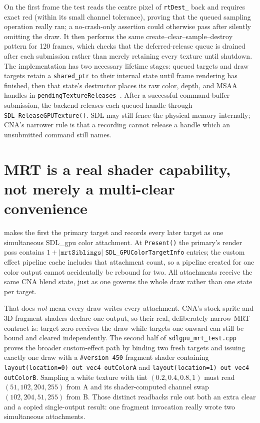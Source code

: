 On the first frame the test reads the centre pixel of \texttt{rtDest\_} back and requires exact
red (within its small channel tolerance), proving that the queued sampling operation really
ran; a no-crash-only assertion could otherwise pass after silently omitting the draw. It then
performs the same create--clear--sample--destroy pattern for 120 frames, which checks that the
deferred-release queue is drained after each submission rather than merely retaining every
texture until shutdown. The implementation has two necessary lifetime stages: queued targets
and draw targets retain a \texttt{shared\_ptr} to their internal state until frame rendering has
finished, then that state's destructor places its raw color, depth, and MSAA handles in
\texttt{pendingTextureReleases\_}. After a successful command-buffer submission, the backend
releases each queued handle through \texttt{SDL\_ReleaseGPUTexture()}. SDL may still fence the
physical memory internally; CNA's narrower rule is that a recording cannot release a handle
which an unsubmitted command still names.

\section{MRT is a real shader capability, not merely a multi-clear convenience}

 makes the first
 the primary target and records every later target as one simultaneous
SDL\_gpu color attachment. At \texttt{Present()} the primary's render pass contains
\(1+\lvert\texttt{mrtSiblings}\rvert\) \texttt{SDL\_GPUColorTargetInfo} entries; the custom
effect pipeline cache includes that attachment count, so a pipeline created for one color output
cannot accidentally be rebound for two. All attachments receive the same CNA blend state, just
as one  governs the whole draw rather than one state per
target.

That does \emph{not} mean every draw writes every attachment. CNA's stock sprite and 3D fragment
shaders declare one output, so their real, deliberately narrow MRT contract is: target zero
receives the draw while targets one onward can still be bound and cleared independently. The
second half of \texttt{sdlgpu\_mrt\_test.cpp} proves the broader custom-effect path by binding
two fresh targets and issuing exactly one  draw with a \texttt{\#version
450} fragment shader containing \texttt{layout(location=0) out vec4 outColorA} and
\texttt{layout(location=1) out vec4 outColorB}. Sampling a white texture with tint
\((0.2,0.4,0.8,1)\) must read \((51,102,204,255)\) from A and its shader-computed channel swap
\((102,204,51,255)\) from B. Those distinct readbacks rule out both an extra clear and a copied
single-output result: one fragment invocation really wrote two simultaneous attachments.


